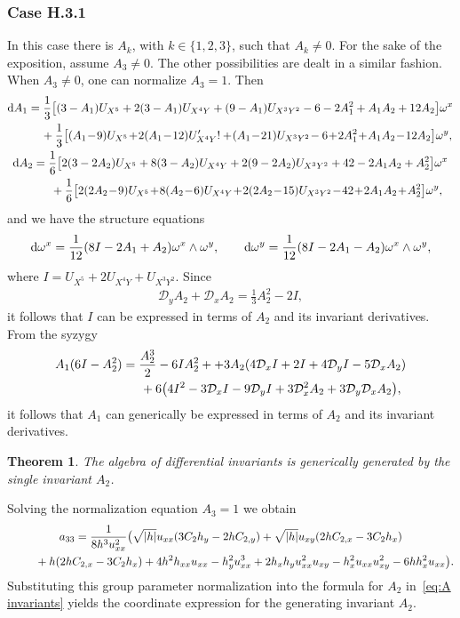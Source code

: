 \documentclass[pdftex]{sigma}%
\numberwithin{equation}{section}
\newtheorem{Theorem}{Theorem}[section]
\newcommand{\D}{\mathcal{D}}
\begin{document}
\subsubsection{Case H.3.1}

In this case there is $A_k$, with $k\in \{1,2,3\}$, such that $A_k\neq 0$. For the sake of the exposition, assume $A_3 \neq 0$. The other possibilities are dealt in a similar fashion. When $A_3\neq 0$, one can normalize $A_3=1$. Then
\begin{gather*}
{\rm d}A_1 = \frac{1}{3}\big[(3-A_1)U_{X^5} +2(3-A_1)U_{X^4Y}+(9-A_1) U_{X^3Y^2}-6-2A_1^2+A_1A_2+12A_2\big]\omega^x
\\ \hphantom{{\rm d}A_1 =}
{}+\frac{1}{3}\big[(A_1\!-\!9)U_{X^5} \!+\!2(A_1\!-\!12)U_{X^4Y}'! +\! (A_1\!-\!21)U_{X^3Y^2}\!-6 \!+\!2 A_1^2\!+\! A_1 A_2 \!- \!12 A_2\big]\omega^y,
\\
{\rm d}A_2 = \frac{1}{6}\big[2(3-2A_2)U_{X^5}+8(3-A_2)U_{X^4Y}+2(9-2A_2)U_{X^3Y^2}+42-2A_1A_2 + A_2^2\big]\omega^x
\\ \hphantom{{\rm d}A_2 =}
{}+\frac{1}{6}\big[2(2A_2\!-\!9)U_{X^5} \!+\!8(A_2\!-\!6)U_{X^4Y} \!+\! 2(2A_2\!-\!15)U_{X^3Y^2}\!-\!42\!+\!2A_1A_2 \!+\! A_2^2\big]\omega^y,
\end{gather*}
%
and we have the structure equations
\begin{gather*}
{\rm d}\omega^x = \frac{1}{12}(8I-2A_1+A_2)\omega^x\wedge \omega^y, \qquad
{\rm d}\omega^y = \frac{1}{12}(8I-2A_1-A_2)\omega^x\wedge \omega^y,
\end{gather*}
where $I= U_{X^5}+2U_{X^4Y} + U_{X^3Y^2}$. Since
\begin{gather*}
\D_y A_2 + \D_x A_2 = \frac{1}{3}A_2^2-2I,
\end{gather*}
it follows that $I$ can be expressed in terms of $A_2$ and its invariant derivatives. From the syzygy
\begin{gather*}
A_1(6I-A_2^2) =\frac{A_2^3}{2} - 6I A_2^2 + +3A_2(4\D_xI + 2I + 4 \D_yI-5\D_xA_2)
\\ \hphantom{A_1(6I-A_2^2) =}
{}+ 6\big(4I^2-3\D_xI - 9 \D_yI+3\D_x^2A_2 + 3\D_y\D_xA_2\big),
\end{gather*}
it follows that $A_1$ can generically be expressed in terms of $A_2$ and its invariant derivatives.

\begin{Theorem}
The algebra of differential invariants is generically generated by the single inva\-riant $A_2$.
\end{Theorem}

\begin{Remark}
Solving the normalization equation $A_3=1$ we obtain
\begin{gather*}
a_{33} = \frac{1}{8h^3 u_{xx}^2}\big(\sqrt{|h|}u_{xx}(3C_2h_y-2hC_{2,y})+\sqrt{|h|}u_{xy}(2hC_{2,x}-3C_2h_x)
\\ \hphantom{a_{33} =}
{}+h(2hC_{2,x}-3C_2h_x)+4h^2h_{xx}u_{xx}-h_y^2u_{xx}^3+2h_xh_yu_{xx}^2u_{xy}-h_x^2u_{xx}u_{xy}^2-6hh_x^2u_{xx}\big).
\end{gather*}
%
Substituting this group parameter normalization into the formula for $A_2$ in~\eqref{eq:A invariants} yields the coordinate expression for the generating invariant $A_2$.
\end{Remark}
\end{document}
